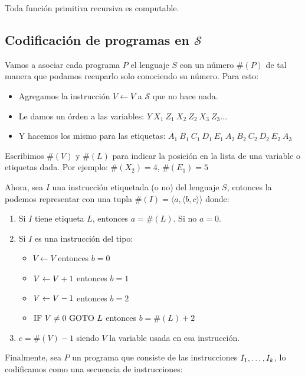 \begin{corolario}
	Toda función primitiva recursiva es computable.
\end{corolario}

\subsection{Codificación de programas en $\mathcal{S}$}\label{secc::codProgramas}

Vamos a asociar cada programa $P$ el lenguaje $S$ con un número $\#(P)$ de tal manera que podamos recuparlo solo conociendo su número. Para esto:
 
\begin{itemize}
	\item Agregamos la instrucción $V \leftarrow V$ a $\mathcal{S}$ que no hace nada.
	\item Le damos un órden a las variables: $Y~X_1~Z_1~X_2~Z_2~X_3~Z_3\dots$
	\item Y hacemos los mismo para las etiquetas: $A_1~B_1~C_1~D_1~E_1~A_2~B_2~C_2~D_2~E_2~A_3$		
\end{itemize}

Escribimos $\#(V)$ y $\#(L)$ para indicar la posición en la lista de una variable o etiquetas dada. Por ejemplo: $\#(X_2) = 4$, $\#(E_1) = 5$

Ahora, sea $I$ una instrucción etiquetada (o no) del lenguaje $S$, entonces la podemos representar con una tupla $\#(I) = \langle a,\langle b,c\rangle\rangle$ donde:

\begin{enumerate}
	\item Si $I$ tiene etiqueta $L$, entonces $a = \#(L)$. Si no $a = 0$.
	\item Si $I$ es una instrucción del tipo:
	\begin{itemize}
		\item $V\leftarrow V$ entonces $b = 0$
		\item $V \leftarrow V + 1$ entonces $b = 1$
		\item $V \leftarrow V - 1$ entonces $b = 2$
		\item $\text{IF }V \neq 0 \text{ GOTO } L$ entonces $b = \#(L) + 2$
	\end{itemize}
	\item $c = \#(V) - 1$ siendo $V$ la variable usada en esa instrucción.
\end{enumerate}

Finalmente, sea $P$ un programa que consiste de las instrucciones $I_1,\dots, I_{k}$, lo codificamos como una secuencia de instrucciones:

